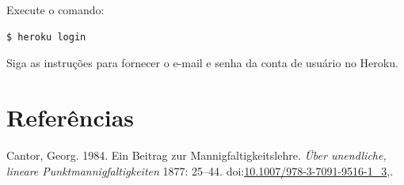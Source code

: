 \documentclass[brazil,a4paper,oneside,openright,parskip=full]{book}
\begin{document}
Execute o comando:

\begin{lstlisting}
$ heroku login
\end{lstlisting}

Siga as instruções para fornecer o e-mail e senha da conta de usuário no
Heroku. \backmatter

\hypertarget{referuxeancias}{%
\chapter*{Referências}\label{referuxeancias}}

\hypertarget{refs}{}
\leavevmode\hypertarget{ref-Cantor1984}{}%
Cantor, Georg. 1984. Ein Beitrag zur Mannigfaltigkeitslehre. \emph{Über
unendliche, lineare Punktmannigfaltigkeiten} 1877: 25--44.
doi:\href{https://doi.org/10.1007/978-3-7091-9516-1_3}{10.1007/978-3-7091-9516-1\_3},.
\end{document}
